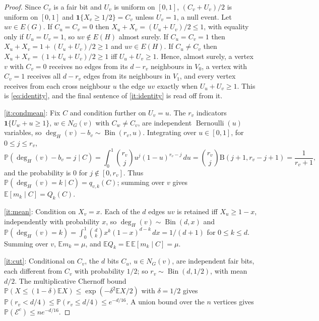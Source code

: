 \documentclass[11pt,a4paper]{article}
\theoremstyle{plain}
\theoremstyle{definition}
\theoremstyle{remark}
\newcommand{\EE}{\mathbb E}
\newcommand{\PP}{\mathbb P}
\newcommand{\ind}{\mathbf 1}
\newcommand{\Bin}{\operatorname{Bin}}
\newcommand{\Ber}{\operatorname{Bernoulli}}
\newcommand{\cE}{\mathcal E}
\newcommand{\degH}{\deg_H}
\begin{document}
\label{pf:decomp}
\lemdecomp*
\begin{proof}
Since $C_v$ is a fair bit and $U_v$ is uniform on $[0,1]$, $(C_v+U_v)/2$ is uniform on $[0,1]$ and $\ind\{X_v\ge1/2\}=C_v$ unless $U_v=1$, a null event. Let $uv\in E(G)$. If $C_u=C_v=0$ then $X_u+X_v=(U_u+U_v)/2\le1$, with equality only if $U_u=U_v=1$, so $uv\notin E(H)$ almost surely. If $C_u=C_v=1$ then $X_u+X_v=1+(U_u+U_v)/2\ge1$ and $uv\in E(H)$. If $C_u\ne C_v$ then $X_u+X_v=(1+U_u+U_v)/2\ge1$ iff $U_u+U_v\ge1$. Hence, almost surely, a vertex $v$ with $C_v=0$ receives no edges from its $d-r_v$ neighbours in $V_0$, a vertex with $C_v=1$ receives all $d-r_v$ edges from its neighbours in $V_1$, and every vertex receives from each cross neighbour $u$ the edge $uv$ exactly when $U_u+U_v\ge1$. This is \eqref{eq:identity}, and the final sentence of \ref{it:identity} is read off from it.

\ref{it:condmean}: Fix $C$ and condition further on $U_v=u$. The $r_v$ indicators $\ind\{U_w+u\ge1\}$, $w\in N_G(v)$ with $C_w\ne C_v$, are independent $\Ber(u)$ variables, so $\degH(v)-b_v\sim\Bin(r_v,u)$. Integrating over $u\in[0,1]$, for $0\le j\le r_v$,
\[
 \PP(\degH(v)-b_v=j\mid C)=\int_0^1\binom{r_v}ju^j(1-u)^{r_v-j}\,du=\binom{r_v}j\mathrm B(j+1,r_v-j+1)=\frac1{r_v+1},
\]
and the probability is $0$ for $j\notin[0,r_v]$. Thus $\PP(\degH(v)=k\mid C)=q_{v,k}(C)$; summing over $v$ gives $\EE[m_k\mid C]=Q_k(C)$.

\ref{it:mean}: Condition on $X_v=x$. Each of the $d$ edges $uv$ is retained iff $X_u\ge1-x$, independently with probability $x$, so $\degH(v)\sim\Bin(d,x)$ and $\PP(\degH(v)=k)=\int_0^1\binom dkx^k(1-x)^{d-k}\,dx=1/(d+1)$ for $0\le k\le d$. Summing over $v$, $\EE m_k=\mu$, and $\EE Q_k=\EE\,\EE[m_k\mid C]=\mu$.

\ref{it:cut}: Conditional on $C_v$, the $d$ bits $C_u$, $u\in N_G(v)$, are independent fair bits, each different from $C_v$ with probability $1/2$; so $r_v\sim\Bin(d,1/2)$, with mean $d/2$. The multiplicative Chernoff bound $\PP(X\le(1-\delta)\EE X)\le\exp(-\delta^2\EE X/2)$ with $\delta=1/2$ gives $\PP(r_v<d/4)\le\PP(r_v\le d/4)\le e^{-d/16}$. A union bound over the $n$ vertices gives $\PP(\cE^c)\le ne^{-d/16}$.
\end{proof}
\end{document}
